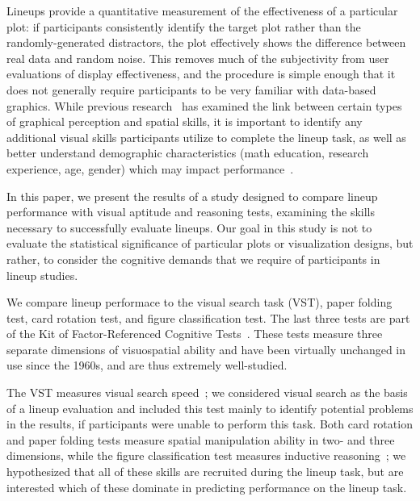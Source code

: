 \documentclass[journal]{vgtc}\usepackage[]{graphicx}\usepackage[]{color}
\begin{document}


Lineups provide a quantitative measurement of the effectiveness of a particular plot: if participants consistently identify the target plot rather than the randomly-generated distractors, the plot effectively shows the difference between real data and random noise. 
This removes much of the subjectivity from user evaluations of display effectiveness, and the procedure is simple enough that it does not generally require participants to be very familiar with data-based graphics. 
While previous research~\cite{lowrie2007solving,mayer1994whom} has examined the link between certain types of graphical perception and spatial skills, it is important to identify any additional visual skills participants utilize to complete the lineup task, as well as better understand demographic characteristics (math education, research experience, age, gender) which may impact performance~\cite{humanfactorslineups}. 

In this paper, we present the results of a study designed to compare lineup performance with visual aptitude and reasoning tests, examining the skills necessary to successfully evaluate lineups. 
Our goal in this study is not to evaluate the statistical significance of particular plots or visualization designs, but rather, to consider the cognitive demands that we require of participants in lineup studies. 


We compare lineup performace to the visual search task (VST), paper folding test, card rotation test, and figure classification test. The last three tests are part of the Kit of Factor-Referenced Cognitive Tests~\cite{educational1963kit, ekstrom1976manual}. These tests measure three separate dimensions of visuospatial ability and have been virtually unchanged in use  since the 1960s, and are thus extremely well-studied.  

The VST measures visual search speed~\cite{goldstein1973validity}; we considered visual search as the basis of a lineup evaluation and included this test mainly to identify potential problems in the results, if participants were unable to perform this task. 
Both  card rotation and paper folding tests measure spatial manipulation ability in two- and three dimensions, while the figure classification test measures inductive reasoning~\cite{ekstrom1976manual}; 
we hypothesized that all of these skills are recruited during the lineup task, but are interested which of these dominate in predicting performance on the lineup task. 
\end{document}
